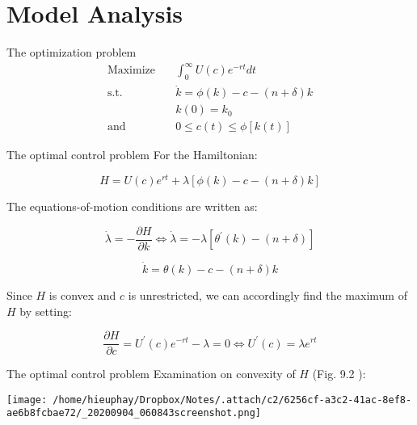 \documentclass[10pt]{beamer}
\begin{document}
\section{Model Analysis}
\label{sec:orge85f0d2}
\begin{frame}[label={sec:org8609de5}]{The optimization problem}
\begin{align*}
\text{Maximize} \quad & \int_0^{\infty} U(c)e^{-rt} dt \\
\text{s.t.} \quad     & \dot{k} = \phi(k) -c - (n + \delta)k \\
                  & k(0) = k_{0} \\
\text{and} \quad      & 0 \leq c(t) \leq \phi[k(t)]
\end{align*}
\end{frame}

\begin{frame}[label={sec:orge7e335e}]{The optimal control problem}
For the Hamiltonian:

$$
H = U(c)e^{rt} + \lambda\left[\phi(k) - c - (n + \delta) k \right]
$$

The equations-of-motion conditions are written as:

\begin{equation}
  \dot{\lambda} = - \frac{\partial H}{\partial k} \Leftrightarrow \dot{\lambda} = -\lambda[\theta^{'}(k) - (n + \delta)]
\end{equation}

\begin{equation}
  \dot{k} = \theta(k) - c - (n + \delta) k
\end{equation}


Since \(H\) is convex and \(c\) is unrestricted, we can accordingly find the maximum of \(H\) by setting:

\begin{equation}
\frac{\partial H}{\partial c} = U^{\prime}(c) e^{-rt} - \lambda = 0 \Leftrightarrow U^{\prime}(c) = \lambda e^{rt}
\end{equation}
\end{frame}

\begin{frame}[label={sec:org60b0761}]{The optimal control problem}
Examination on convexity of \(H\) (Fig. 9.2 \cite{chiang2000elements}):

\begin{center}
\texttt{[image: /home/hieuphay/Dropbox/Notes/.attach/c2/6256cf-a3c2-41ac-8ef8-ae6b8fcbae72/\_20200904\_060843screenshot.png]}
\end{center}
\end{frame}
\end{document}

